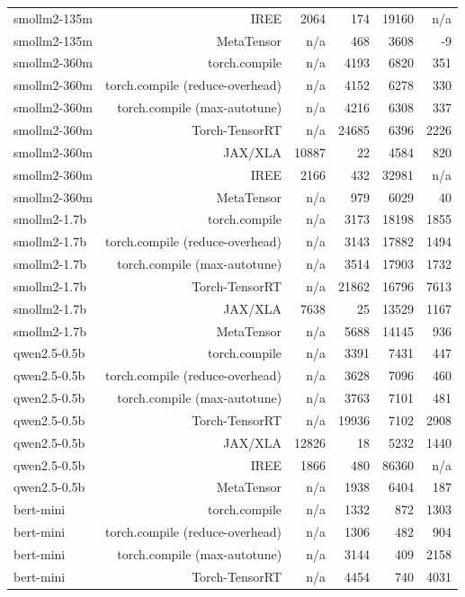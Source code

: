 \begin{tabular}{lrrrrr}
smollm2-135m & IREE & 2064 & 174 & 19160 & n/a \\
smollm2-135m & MetaTensor & n/a & 468 & 3608 & -9 \\
smollm2-360m & torch.compile & n/a & 4193 & 6820 & 351 \\
smollm2-360m & torch.compile (reduce-overhead) & n/a & 4152 & 6278 & 330 \\
smollm2-360m & torch.compile (max-autotune) & n/a & 4216 & 6308 & 337 \\
smollm2-360m & Torch-TensorRT & n/a & 24685 & 6396 & 2226 \\
smollm2-360m & JAX/XLA & 10887 & 22 & 4584 & 820 \\
smollm2-360m & IREE & 2166 & 432 & 32981 & n/a \\
smollm2-360m & MetaTensor & n/a & 979 & 6029 & 40 \\
smollm2-1.7b & torch.compile & n/a & 3173 & 18198 & 1855 \\
smollm2-1.7b & torch.compile (reduce-overhead) & n/a & 3143 & 17882 & 1494 \\
smollm2-1.7b & torch.compile (max-autotune) & n/a & 3514 & 17903 & 1732 \\
smollm2-1.7b & Torch-TensorRT & n/a & 21862 & 16796 & 7613 \\
smollm2-1.7b & JAX/XLA & 7638 & 25 & 13529 & 1167 \\
smollm2-1.7b & MetaTensor & n/a & 5688 & 14145 & 936 \\
qwen2.5-0.5b & torch.compile & n/a & 3391 & 7431 & 447 \\
qwen2.5-0.5b & torch.compile (reduce-overhead) & n/a & 3628 & 7096 & 460 \\
qwen2.5-0.5b & torch.compile (max-autotune) & n/a & 3763 & 7101 & 481 \\
qwen2.5-0.5b & Torch-TensorRT & n/a & 19936 & 7102 & 2908 \\
qwen2.5-0.5b & JAX/XLA & 12826 & 18 & 5232 & 1440 \\
qwen2.5-0.5b & IREE & 1866 & 480 & 86360 & n/a \\
qwen2.5-0.5b & MetaTensor & n/a & 1938 & 6404 & 187 \\
bert-mini & torch.compile & n/a & 1332 & 872 & 1303 \\
bert-mini & torch.compile (reduce-overhead) & n/a & 1306 & 482 & 904 \\
bert-mini & torch.compile (max-autotune) & n/a & 3144 & 409 & 2158 \\
bert-mini & Torch-TensorRT & n/a & 4454 & 740 & 4031 \\

\end{tabular}
